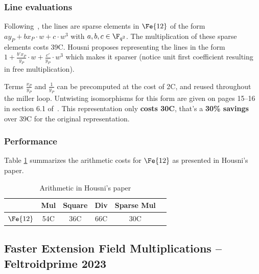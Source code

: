 \subsubsection{Line evaluations}

Following~\cite{Ara13}, the lines are sparse elements in $\Fe{12}$ of the form $ay_P + bx_P \cdot w + c \cdot w^3$ with $a, b, c \in \F_{q^{2}}$. The multiplication of these sparse elements costs 39C.
Housni proposes representing the lines in the form $1 + \frac{b'x_P}{y_P} \cdot w + \frac{c'}{y_P} \cdot w^3$ which makes it sparser (notice unit first coefficient resulting in free multiplication).


Terms $\frac{x_P}{y_P}$ and $\frac{1}{y_P}$ can be precomputed at the cost of 2C, and reused throughout the miller loop. Untwisting isomorphisms for this form are given on pages 15–16 in section 6.1 of~\cite{PR1CS22}.
This representation only \textbf{costs 30C}, that's a \textbf{30\% savings} over 39C for the original representation.

\subsubsection{Performance}

Table \ref{tab:fq12_pr1cs} summarizes the arithmetic costs for $\Fe{12}$ as presented in Housni's paper.

\begin{table}[h]
\centering
\caption{Arithmetic in Housni's paper\cite{PR1CS22}}
\label{tab:fq12_pr1cs}
\begin{tabular}{|c|c|c|c|c|c|}
\hline
 & Mul & Square & Div & Sparse Mul \\
\hline
$\Fe{12}$ & 54C & 36C & 66C & 30C \\
\hline
\end{tabular}
\end{table}



\subsection{Faster Extension Field Multiplications -- Feltroidprime 2023}

